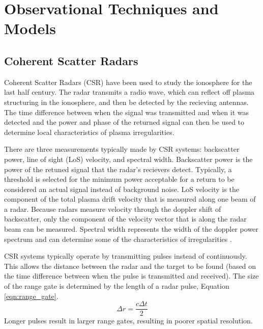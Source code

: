 \section{Observational Techniques and Models}


\subsection{Coherent Scatter Radars}
\label{sec:csr}
Coherent Scatter Radars (CSR) have been used to study the ionosphere for the last half century.  The radar transmits a radio wave, which can reflect off plasma structuring in the ionosphere, and then be detected by the recieving antennas.  The time difference between when the signal was transmitted and when it was detected and the power and phase of the returned signal can then be used to determine local characteristics of plasma irregularities.

There are three measurements typically made by CSR systems: backscatter power, line of sight (LoS) velocity, and spectral width.  Backscatter power is the power of the retuned signal that the radar's recievers detect.  Typically, a threshold is selected for the minimum power acceptable for a return to be considered an actual signal instead of background noise.  LoS velocity is the component of the total plasma drift velocity that is measured along one beam of a radar.  Because radars measure velocity through the doppler shift of backscatter, only the component of the velocity vector that is along the radar beam can be measured.  Spectral width represents the width of the doppler power spectrum and can determine some of the characteristics of irregularities \citep{Greenwald1985}.

CSR systems typically operate by transmitting pulses instead of continuously.  This allows the distance between the radar and the target to be found (based on the time difference between when the pulse is transmitted and received).  The size of the range gate is determined by the length of a radar pulse, Equation \ref{eqn:range_gate}.
\begin{equation}
	\label{eqn:range_gate}
	\Delta r = \frac{c\Delta t}{2}
\end{equation}
Longer pulses result in larger range gates, resulting in poorer spatial resolution.

